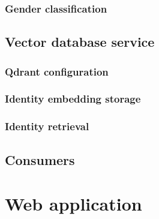 \documentclass[../main.tex]{subfiles}
\begin{document}
    \subsubsection{Gender classification}

\subsection{Vector database service}

    \subsubsection{Qdrant configuration}

    \subsubsection{Identity embedding storage}

    \subsubsection{Identity retrieval}

\subsection{Consumers}

\section{Web application}
\end{document}
